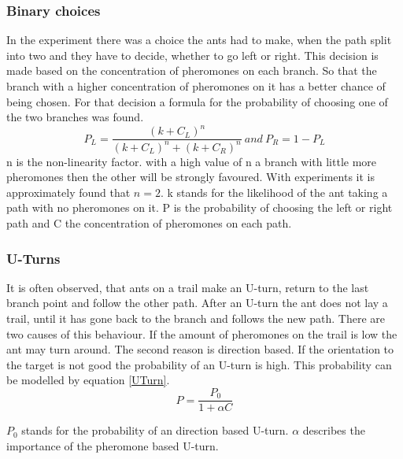  \subsubsection{Binary choices}
 In the experiment there was a choice the ants had to make, when the path split into two and they have to decide, whether to go left or right. This decision is made based on the concentration of pheromones on each branch. So that the branch with a higher concentration of pheromones on it has a better chance of being chosen. For that decision a formula for the probability of choosing one of the two branches was found.
  \begin{equation} \label{binaryChoice}
 P_L = \frac{(k+C_L)^n}{(k+C_L)^n+(k+C_R)^n} \ and \  P_R = 1-P_L
 \end{equation}
 n is the non-linearity factor. with a high value of n a branch with little more pheromones then the other will be strongly favoured. With experiments it is approximately found that $n=2$. k stands for the likelihood of the ant taking a path with no pheromones on it. P is the probability of choosing the left or right path and C the concentration of pheromones on each path. 
 \subsubsection{U-Turns}
 It is often observed, that ants on a trail make an U-turn, return to the last branch point and follow the other path. After an U-turn the ant does not lay a trail, until it has gone back to the branch and follows the new path. There are two causes of this behaviour. If the amount of pheromones on the trail is low the ant may turn around. The second reason is direction based. If the orientation to the target is not good the probability of an U-turn is high. This probability can be modelled by equation \ref{UTurn}. \citep{camazine2003}
\begin{equation} \label{UTurn}
 P=\frac{P_0}{1+\alpha C}
\end{equation}

$P_0$ stands for the probability of an direction based U-turn. $\alpha$ describes the importance of the pheromone based U-turn.
